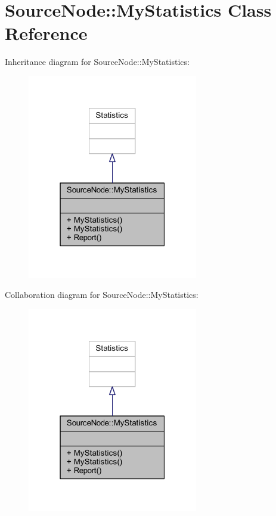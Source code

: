 \hypertarget{class_source_node_1_1_my_statistics}{}\section{Source\+Node\+:\+:My\+Statistics Class Reference}
\label{class_source_node_1_1_my_statistics}


Inheritance diagram for Source\+Node\+:\+:My\+Statistics\+:
\nopagebreak
\begin{figure}[H]
\begin{center}
\leavevmode
\includegraphics[width=211pt]{class_source_node_1_1_my_statistics__inherit__graph}
\end{center}
\end{figure}


Collaboration diagram for Source\+Node\+:\+:My\+Statistics\+:
\nopagebreak
\begin{figure}[H]
\begin{center}
\leavevmode
\includegraphics[width=211pt]{class_source_node_1_1_my_statistics__coll__graph}
\end{center}
\end{figure}
